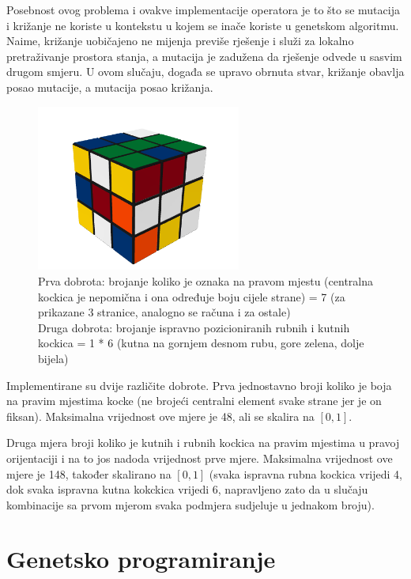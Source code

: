 \documentclass[times, utf8, seminar, numeric]{fer}
\begin{document}
Posebnost ovog problema i ovakve implementacije operatora je to što se mutacija i križanje ne koriste u kontekstu u kojem se inače koriste u genetskom algoritmu. Naime, križanje uobičajeno ne mijenja previše rješenje i služi za lokalno pretraživanje prostora stanja, a mutacija je zadužena da rješenje odvede u sasvim drugom smjeru. U ovom slučaju, događa se upravo obrnuta stvar, križanje obavlja posao mutacije, a mutacija posao križanja.

\begin{figure}[h!]
\centering
\includegraphics[width=0.6\textwidth]{image/rubik_cube_scrambled.png}
\caption{Prva dobrota: brojanje koliko je oznaka na pravom mjestu (centralna kockica je nepomična i ona određuje boju cijele strane) = 7 (za prikazane 3 stranice, analogno se računa i za ostale)\\
Druga dobrota: brojanje ispravno pozicioniranih rubnih i kutnih kockica = 1 * 6 (kutna na gornjem desnom rubu, gore zelena, dolje bijela)}

\end{figure}

Implementirane su dvije različite dobrote. 
Prva jednostavno broji koliko je boja na pravim mjestima kocke (ne brojeći centralni element svake strane jer je on fiksan). Maksimalna vrijednost ove mjere je 48, ali se skalira na $[0, 1]$.

Druga mjera broji koliko je kutnih i rubnih kockica na pravim mjestima u pravoj orijentaciji i na to jos nadoda vrijednost prve mjere. Maksimalna vrijednost ove mjere je 148, također skalirano na $[0, 1]$ (svaka ispravna rubna kockica vrijedi 4, dok svaka ispravna kutna kokckica vrijedi 6, napravljeno zato da u slučaju kombinacije sa prvom mjerom svaka podmjera sudjeluje u jednakom broju).


\chapter{Genetsko programiranje}
\end{document}
